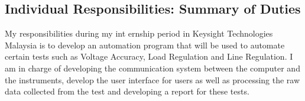\subsection{Individual Responsibilities: Summary of Duties}
My responsibilities during my int ernship period in Keysight Technologies Malaysia is to develop an automation program that will be used
to automate certain tests such as Voltage Accuracy, Load Regulation and Line Regulation. I am in charge of developing the communication system between the 
computer and the instruments, develop the user interface for users as well as processing the raw data collected from the test 
and developing a report for these tests. 